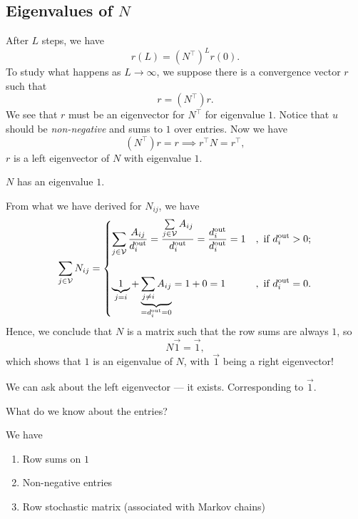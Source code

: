 \subsection{Eigenvalues of \(N\)}
After \(L\) steps, we have
\[
	r(L) = (N^{\top})^L r(0).
\]
To study what happens as \(L\to \infty\), we suppose there is a convergence vector \(r\) such that
\[
	r = (N^{\top})r.
\]
We see that \(r\) must be an eigenvector for \(N^{\top}\) for eigenvalue \(1\). Notice that \(u\) should be
\emph{non-negative} and sums to \(1\) over entries. Now we have
\[
	(N^{\top})r = r \implies r^{\top}N = r^{\top},
\]
\(r\) is a left eigenvector of \(N\) with eigenvalue \(1\).
\begin{note}
	\(N\) has an eigenvalue \(1\).
\end{note}
\begin{explanation}

	From what we have derived for \(N_{ij} \), we have
	\[
		\sum\limits_{j\in\mathcal{V}}N_{ij} = \begin{dcases}
			\sum\limits_{j\in\mathcal{V}} \frac{A_{ij}}{d_{i}^{\text{out}}} = \frac{\sum\limits_{j\in\mathcal{V}} A_{ij} }{d_{i}^{\text{out}}} = \frac{d_{i}^{\text{out}}}{d_{i}^{\text{out}}}= 1 & , \text{ if }d_{i}^{\text{out}} > 0; \\\\
			\underbrace{1}_{j = i} + \underbrace{\sum\limits_{j\neq i} A_{ij}}_{ = d_{i}^{\text{out}} = 0} = 1 + 0 = 1                                                                            & , \text{ if }d_{i}^{\text{out}} = 0. \\
		\end{dcases}
	\]
	Hence, we conclude that \(N\) is a matrix such that the row sums are always \(1\), so
	\[
		N \vec{1} = \vec{1},
	\]
	which shows that \(1\) is an eigenvalue of \(N\), with \(\vec{1}\) being a right eigenvector!
\end{explanation}

We can ask about the left eigenvector — it exists. Corresponding to \(\vec{1}\).
\begin{problem}
What do we know about the entries?
\end{problem}
\begin{answer}
	We have
	\begin{enumerate}
		\item Row sums on \(1\)
		\item Non-negative entries
		\item Row stochastic matrix (associated with Markov chains)
	\end{enumerate}
\end{answer}

